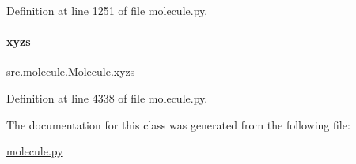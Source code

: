 Definition at line 1251 of file molecule.\+py.

\mbox{\label{classsrc_1_1molecule_1_1Molecule_a9701dad854112650bd6b7601cab8b40b}} 
\paragraph{\texorpdfstring{xyzs}{xyzs}}
{\footnotesize\ttfamily src.\+molecule.\+Molecule.\+xyzs}



Definition at line 4338 of file molecule.\+py.



The documentation for this class was generated from the following file\+:\begin{DoxyCompactItemize}
\item 
\hyperlink{molecule_8py}{molecule.\+py}\end{DoxyCompactItemize}
